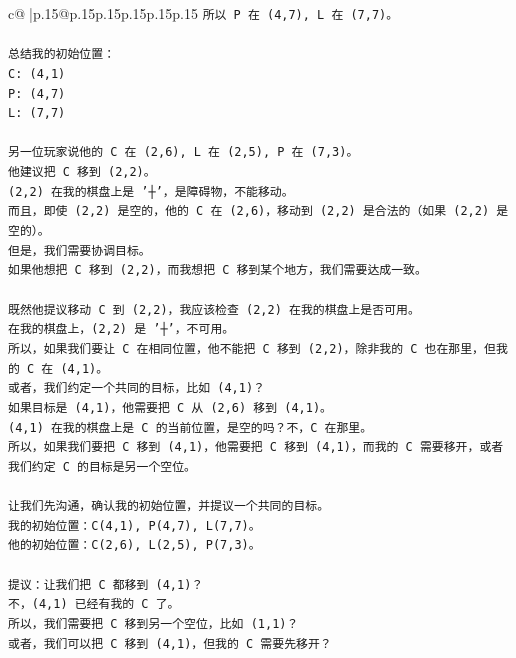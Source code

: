 \documentclass{article}
\begin{document}
{\begin{supertabular}{c@{$\;$}|p{.15\linewidth}@{}p{.15\linewidth}p{.15\linewidth}p{.15\linewidth}p{.15\linewidth}p{.15\linewidth}}
{{{\texttt{所以 P 在 (4,7), L 在 (7,7)。} \\
\\ 
\texttt{总结我的初始位置：} \\
\texttt{C: (4,1)} \\
\texttt{P: (4,7)} \\
\texttt{L: (7,7)} \\
\\ 
\texttt{另一位玩家说他的 C 在 (2,6), L 在 (2,5), P 在 (7,3)。} \\
\texttt{他建议把 C 移到 (2,2)。} \\
\texttt{(2,2) 在我的棋盘上是 '┼'，是障碍物，不能移动。} \\
\texttt{而且，即使 (2,2) 是空的，他的 C 在 (2,6)，移动到 (2,2) 是合法的（如果 (2,2) 是空的）。} \\
\texttt{但是，我们需要协调目标。} \\
\texttt{如果他想把 C 移到 (2,2)，而我想把 C 移到某个地方，我们需要达成一致。} \\
\\ 
\texttt{既然他提议移动 C 到 (2,2)，我应该检查 (2,2) 在我的棋盘上是否可用。} \\
\texttt{在我的棋盘上，(2,2) 是 '┼'，不可用。} \\
\texttt{所以，如果我们要让 C 在相同位置，他不能把 C 移到 (2,2)，除非我的 C 也在那里，但我的 C 在 (4,1)。} \\
\texttt{或者，我们约定一个共同的目标，比如 (4,1)？} \\
\texttt{如果目标是 (4,1)，他需要把 C 从 (2,6) 移到 (4,1)。} \\
\texttt{(4,1) 在我的棋盘上是 C 的当前位置，是空的吗？不，C 在那里。} \\
\texttt{所以，如果我们要把 C 移到 (4,1)，他需要把 C 移到 (4,1)，而我的 C 需要移开，或者我们约定 C 的目标是另一个空位。} \\
\\ 
\texttt{让我们先沟通，确认我的初始位置，并提议一个共同的目标。} \\
\texttt{我的初始位置：C(4,1), P(4,7), L(7,7)。} \\
\texttt{他的初始位置：C(2,6), L(2,5), P(7,3)。} \\
\\ 
\texttt{提议：让我们把 C 都移到 (4,1)？} \\
\texttt{不，(4,1) 已经有我的 C 了。} \\
\texttt{所以，我们需要把 C 移到另一个空位，比如 (1,1)？} \\
\texttt{或者，我们可以把 C 移到 (4,1)，但我的 C 需要先移开？} \\
}}}
\end{supertabular}}
\end{document}
